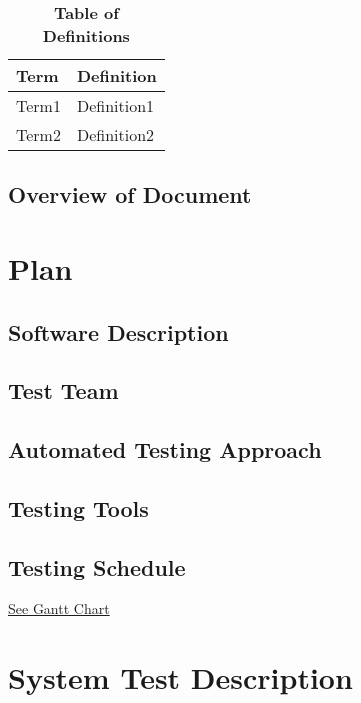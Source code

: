 \documentclass[12pt, titlepage]{article}
\begin{document}
\begin{table}[!htbp]
\caption{\textbf{Table of Definitions}} \label{Table}

\begin{tabularx}{\textwidth}{p{3cm}X}
\toprule
\textbf{Term} & \textbf{Definition}\\
\midrule
Term1 & Definition1\\
Term2 & Definition2\\
\bottomrule
\end{tabularx}

\end{table}	

\subsection{Overview of Document}

\section{Plan}
	
\subsection{Software Description}

\subsection{Test Team}

\subsection{Automated Testing Approach}

\subsection{Testing Tools}

\subsection{Testing Schedule}
		
\href{../DevelopmentPlan/schedule.png}{See Gantt Chart}

\section{System Test Description}
	
\end{document}
